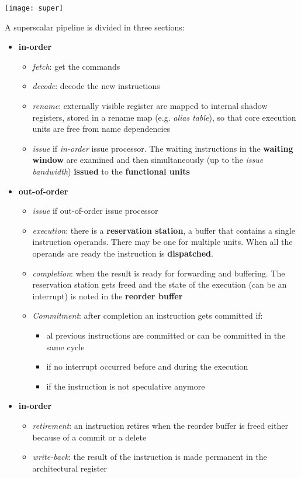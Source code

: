 \begin{center}
	\texttt{[image: super]}
\end{center}

A superscalar pipeline is divided in three sections:
\begin{itemize}
	\item \textbf{in-order}
	\begin{itemize}
		\item \textit{fetch}: get the commands
		\item \textit{decode}: decode the new instructions
		\item \textit{rename}: externally visible register are mapped to internal shadow registers, stored in a rename map (e.g. \textit{alias table}), so that core execution units are free from name dependencies
		\item \textit{issue} if \textit{in-order} issue processor. The waiting instructions in the \textbf{waiting window} are examined and then simultaneously (up to the \textit{issue bandwidth}) \textbf{issued} to the \textbf{functional units}
	\end{itemize}
	\item \textbf{out-of-order}
	\begin{itemize}
		\item \textit{issue} if out-of-order issue processor
		\item \textit{execution}: there is a \textbf{reservation station}, a buffer that contains a single instruction operands. There may be one for multiple units. When all the operands are ready the instruction is \textbf{dispatched}.
		\item \textit{completion}: when the result is ready for forwarding and buffering. The reservation station gets freed and the state of the execution (can be an interrupt) is noted in the \textbf{reorder buffer}
		\item \textit{Commitment}: after completion an instruction gets committed if:
		\begin{itemize}
			\item al previous instructions are committed or can be committed in the same cycle
			\item if no interrupt occurred before and during the execution
			\item if the instruction is not speculative anymore
		\end{itemize}
	\end{itemize}
	\item \textbf{in-order}
	\begin{itemize}
		\item \textit{retirement}: an instruction retires when the reorder buffer is freed either because of a commit or a delete
		\item \textit{write-back}: the result of the instruction is made permanent in the architectural register
	\end{itemize}
\end{itemize}